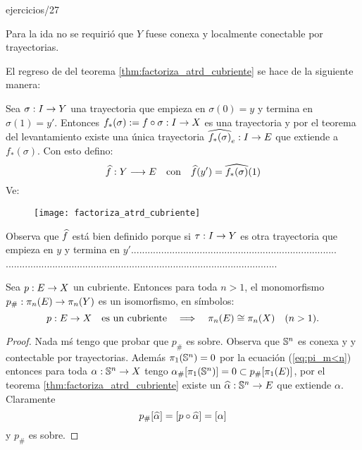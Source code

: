 \documentclass[../../topologia_algebraica]{subfiles}
\begin{document}
{ejercicios/27} %

\begin{nota}
  Para la ida no se requiri\'o que $Y$ fuese conexa y localmente conectable por trayectorias.
\end{nota}

El regreso de del teorema \ref{thm:factoriza_atrd_cubriente} se hace de la siguiente manera:

Sea $\sigma:I\rightarrow Y$ una trayectoria que empieza en $\sigma(0)=y$ y termina en $\sigma(1)=y'$.
Entonces $f_*(\sigma):=f\circ\sigma:I\rightarrow X$ es una trayectoria y por el teorema del
levantamiento existe una \'unica trayectoria $\widehat{ f_*(\sigma) }_e:I\rightarrow E$ que extiende a
$f_*(\sigma)$. Con esto defino:
\[
  \widehat{ f }:Y \longrightarrow E \quad\text{con}\quad \widehat{ f }(y')=\widehat{ f_*(\sigma) }(1)
\]
Ve:
\begin{figure}[ht] %
  \centering
  \texttt{[image: factoriza\_atrd\_cubriente]}
\end{figure}%

Observa que $\widehat{ f }$ est\'a bien definido porque si $\tau:I\rightarrow Y$ es otra trayectoria que empieza
en $y$ y termina en $y'$...........................................................................
...................................................................................................

\begin{cor}
  Sea $p:E\rightarrow X$ un cubriente. Entonces para toda $n>1$, el monomorfismo $p_{\#}:\pi_n(E)\rightarrow\pi_n(Y)$
  es un isomorfismo, en s\'imbolos:
  \[
    p:E\rightarrow X \quad\text{es un cubriente} \quad\Longrightarrow\quad \pi_n(E)\cong\pi_n(X) \quad(n>1).
  \]
  
\end{cor}
\begin{proof}
  Nada m\'s tengo que probar que $p_{\#}$ es sobre. Observa que $\mathbb{S}^n$ es conexa y y contectable
  por trayectorias. Adem\'as $\pi_1(\mathbb{S}^n)=0$ por la ecuaci\'on (\ref{eq:pi_m<n}) entonces para
  toda $\alpha:\mathbb{S}^n\rightarrow X$ tengo $\alpha_{\#}[\pi_1(\mathbb{S}^n)]=0\subset p_{\#}[\pi_1(E)]$, por el
  teorema \ref{thm:factoriza_atrd_cubriente} existe un $\widehat{ \alpha }:\mathbb{S}^n\rightarrow E$ que extiende
  $\alpha$. Claramente
  \[
    p_{\#}[\widehat{ \alpha }]=[p\circ\widehat{ \alpha }]=[\alpha]
  \]
  y $p_{\#}$ es sobre.
\end{proof}
\end{document}
